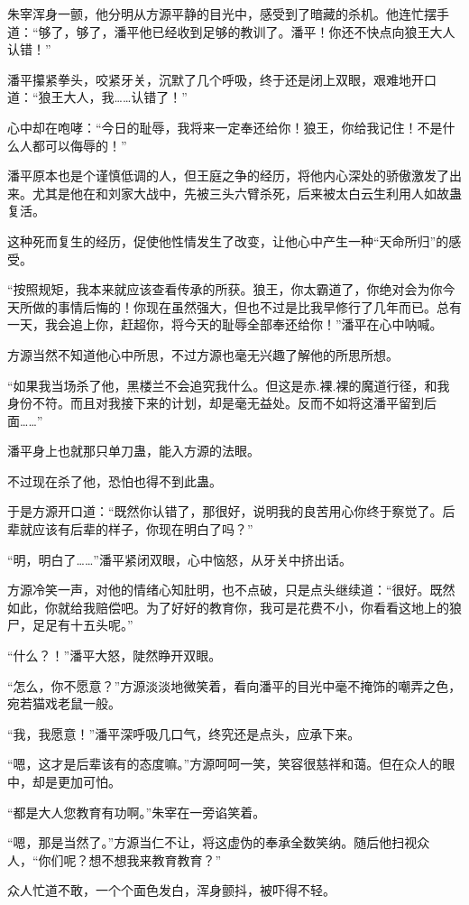 \begin{this_body}
朱宰浑身一颤，他分明从方源平静的目光中，感受到了暗藏的杀机。他连忙摆手道：“够了，够了，潘平他已经收到足够的教训了。潘平！你还不快点向狼王大人认错！”

潘平攥紧拳头，咬紧牙关，沉默了几个呼吸，终于还是闭上双眼，艰难地开口道：“狼王大人，我……认错了！”

心中却在咆哮：“今日的耻辱，我将来一定奉还给你！狼王，你给我记住！不是什么人都可以侮辱的！”

潘平原本也是个谨慎低调的人，但王庭之争的经历，将他内心深处的骄傲激发了出来。尤其是他在和刘家大战中，先被三头六臂杀死，后来被太白云生利用人如故蛊复活。

这种死而复生的经历，促使他性情发生了改变，让他心中产生一种“天命所归”的感受。

“按照规矩，我本来就应该查看传承的所获。狼王，你太霸道了，你绝对会为你今天所做的事情后悔的！你现在虽然强大，但也不过是比我早修行了几年而已。总有一天，我会追上你，赶超你，将今天的耻辱全部奉还给你！”潘平在心中呐喊。

方源当然不知道他心中所思，不过方源也毫无兴趣了解他的所思所想。

“如果我当场杀了他，黑楼兰不会追究我什么。但这是赤.裸.裸的魔道行径，和我身份不符。而且对我接下来的计划，却是毫无益处。反而不如将这潘平留到后面……”

潘平身上也就那只单刀蛊，能入方源的法眼。

不过现在杀了他，恐怕也得不到此蛊。

于是方源开口道：“既然你认错了，那很好，说明我的良苦用心你终于察觉了。后辈就应该有后辈的样子，你现在明白了吗？”

“明，明白了……”潘平紧闭双眼，心中恼怒，从牙关中挤出话。

方源冷笑一声，对他的情绪心知肚明，也不点破，只是点头继续道：“很好。既然如此，你就给我赔偿吧。为了好好的教育你，我可是花费不小，你看看这地上的狼尸，足足有十五头呢。”

“什么？！”潘平大怒，陡然睁开双眼。

“怎么，你不愿意？”方源淡淡地微笑着，看向潘平的目光中毫不掩饰的嘲弄之色，宛若猫戏老鼠一般。

“我，我愿意！”潘平深呼吸几口气，终究还是点头，应承下来。

“嗯，这才是后辈该有的态度嘛。”方源呵呵一笑，笑容很慈祥和蔼。但在众人的眼中，却是更加可怕。

“都是大人您教育有功啊。”朱宰在一旁谄笑着。

“嗯，那是当然了。”方源当仁不让，将这虚伪的奉承全数笑纳。随后他扫视众人，“你们呢？想不想我来教育教育？”

众人忙道不敢，一个个面色发白，浑身颤抖，被吓得不轻。


\end{this_body}
